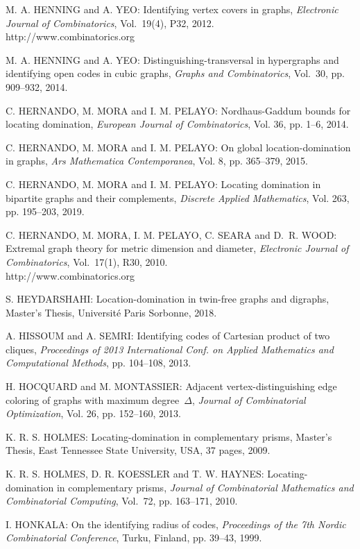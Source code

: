 \begin{thebibliography}{999}
M. A. HENNING and A. YEO: Identifying vertex covers in graphs, {\it Electronic Journal of Combinatorics}, Vol.~19(4), P32, 2012.\\
http://www.combinatorics.org

M. A. HENNING and A. YEO: Distinguishing-transversal in hypergraphs and identifying open codes in cubic graphs, {\it Graphs and Combinatorics}, Vol.~30, pp. 909--932, 2014.

C. HERNANDO, M. MORA and I. M. PELAYO: Nordhaus-Gaddum bounds for locating domination, {\it European Journal of Combinatorics}, Vol. 36, pp. 1--6, 2014. 

C. HERNANDO, M. MORA and I. M. PELAYO: On global location-domination in graphs, {\it Ars Mathematica Contemporanea}, Vol. 8, pp. 365--379, 2015.

C. HERNANDO, M. MORA and I. M. PELAYO: Locating domination in bipartite graphs and their complements, {\it Discrete Applied Mathematics}, Vol. 263, pp. 195--203, 2019.

C. HERNANDO, M. MORA, I. M. PELAYO, C. SEARA and D.~R. WOOD: Extremal graph theory for metric dimension and diameter, {\it Electronic Journal of Combinatorics}, Vol.~17(1), R30, 2010.\\
http://www.combinatorics.org

S. HEYDARSHAHI: Location-domination in twin-free graphs and digraphs, Master's Thesis, Universit\'e Paris Sorbonne, 2018.

A. HISSOUM and A. SEMRI: Identifying codes of Cartesian product of two cliques, {\it Proceedings of 2013 International Conf. on Applied Mathematics and Computational Methods}, pp. 104--108, 2013.

H. HOCQUARD and M. MONTASSIER: Adjacent vertex-distinguishing edge coloring of graphs with maximum degree~$\Delta$, {\it Journal of Combinatorial Optimization}, Vol. 26, pp. 152--160, 2013.

K. R. S. HOLMES: Locating-domination in complementary prisms, Master's Thesis, East Tennessee State University, USA, 37 pages, 2009.

K. R. S. HOLMES, D. R. KOESSLER and T. W. HAYNES: Locating-domination in
complementary prisms, {\it Journal of Combinatorial Mathematics and Combinatorial
Computing}, Vol.~72, pp. 163--171, 2010.

I. HONKALA: On the identifying radius of codes, {\it Proceedings of the 7th Nordic Combinatorial Conference}, Turku, Finland, pp. 39--43, 1999.


\end{thebibliography}
